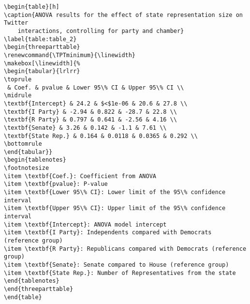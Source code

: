 \documentclass[11pt]{article}
\begin{document}
\begin{Verbatim}[tabsize=4]
\begin{table}[h]
\caption{ANOVA results for the effect of state representation size on Twitter
	interactions, controlling for party and chamber}
\label{table:table_2}
\begin{threeparttable}
\renewcommand{\TPTminimum}{\linewidth}
\makebox[\linewidth]{%
\begin{tabular}{lrlrr}
\toprule
 & Coef. & pvalue & Lower 95\% CI & Upper 95\% CI \\
\midrule
\textbf{Intercept} & 24.2 & $<$1e-06 & 20.6 & 27.8 \\
\textbf{I Party} & -2.94 & 0.822 & -28.7 & 22.8 \\
\textbf{R Party} & 0.797 & 0.641 & -2.56 & 4.16 \\
\textbf{Senate} & 3.26 & 0.142 & -1.1 & 7.61 \\
\textbf{State Rep.} & 0.164 & 0.0118 & 0.0365 & 0.292 \\
\bottomrule
\end{tabular}}
\begin{tablenotes}
\footnotesize
\item \textbf{Coef.}: Coefficient from ANOVA
\item \textbf{pvalue}: P-value
\item \textbf{Lower 95\% CI}: Lower limit of the 95\% confidence interval
\item \textbf{Upper 95\% CI}: Upper limit of the 95\% confidence interval
\item \textbf{Intercept}: ANOVA model intercept
\item \textbf{I Party}: Independents compared with Democrats (reference group)
\item \textbf{R Party}: Republicans compared with Democrats (reference group)
\item \textbf{Senate}: Senate compared to House (reference group)
\item \textbf{State Rep.}: Number of Representatives from the state
\end{tablenotes}
\end{threeparttable}
\end{table}

\end{Verbatim}




\end{document}
